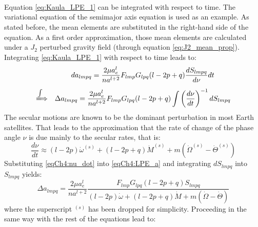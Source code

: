 				\paragraph{  \\}
				\indent Equation \eqref{eq:Kaula_LPE_1} can be integrated with respect to time. The variational equation of the semimajor axis equation is used as an example. As stated before, the mean elements are substituted in the right-hand side of the equation. As a first order approximation, those mean elements are calculated under a $J_2$ perturbed gravity field (through equation \eqref{eq:J2_mean_prop}).\\
				\indent Integrating \eqref{eq:Kaula_LPE_1} with respect to time leads to:
				\begin{equation}
				\begin{array}{ccc}
				& da_{lmpq} = \dfrac{2\mu a_e^l}{na^{l+2}} F_{lmp} G_{lpq} (l - 2p + q)\dfrac{ d S_{lmpq}}{d \nu} dt  \\[1.2em]
				\xLongrightarrow{\int} & \Delta a_{lmpq} = \dfrac{2\mu a_e^l}{na^{l+2}} F_{lmp} G_{lpq} (l - 2p + q) \dint \left( \dfrac{d\nu}{dt} \right)^{-1} dS_{lmpq} \\
				\end{array}
				\label{eqCh4:LPE_a}
				\end{equation}
				\indent The secular motions are known to be the dominant perturbation in most Earth satellites. That leads to the approximation that the rate of change of the phase angle $\nu$ is due mainly to the secular rates, that is:
				\begin{equation}
				\dfrac{d\nu}{dt} \approx (l - 2p) \dot{\omega}^{(s)} + (l - 2p + q) \dot{M}^{(s)} + m \left( \dot{\Omega}^{(s)}  - \dot{\Theta}^{(s)}\right)
				\label{eqCh4:nu_dot} 
				\end{equation}
				\indent Substituting \eqref{eqCh4:nu_dot} into \eqref{eqCh4:LPE_a} and integrating $dS_{lmpq}$ into $S_{lmpq}$ yields:
				\begin{equation}
				\Delta a_{lmpq} = \dfrac{2\mu a_e^l}{na^{l+2}} \dfrac{F_{lmp} G_{lpq} (l - 2p + q)  S_{lmpq}}{(l - 2p) \dot{\omega} + (l - 2p + q) \dot{M} + m \left( \dot{\Omega}  - \dot{\Theta}\right)}
				\end{equation}
				\noindent where the superscript $^{(s)}$ has been dropped for simplicity. Proceeding in the same way with the rest of the equations lead to:
